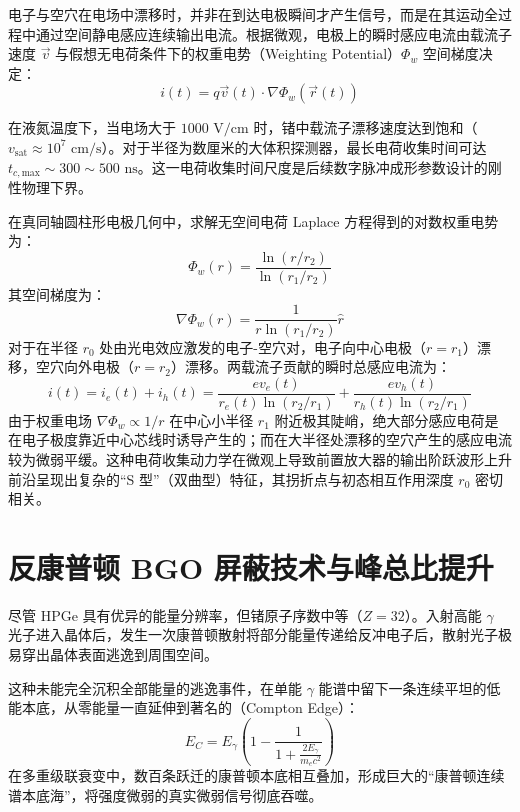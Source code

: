 电子与空穴在电场中漂移时，并非在到达电极瞬间才产生信号，而是在其运动全过程中通过空间静电感应连续输出电流。根据微观，电极上的瞬时感应电流由载流子速度 $\vec{v}$ 与假想无电荷条件下的权重电势（Weighting Potential）$\Phi_w$ 空间梯度决定：
\begin{equation}
    i(t) = q \vec{v}(t) \cdot \nabla \Phi_w(\vec{r}(t))
    \label{eq:shockley_ramo}
\end{equation}

在液氮温度下，当电场大于 $1000\text{ V/cm}$ 时，锗中载流子漂移速度达到饱和（$v_{\text{sat}} \approx 10^7\text{ cm/s}$）。对于半径为数厘米的大体积探测器，最长电荷收集时间可达 $t_{c,\text{max}} \sim 300 \sim 500\text{ ns}$。这一电荷收集时间尺度是后续数字脉冲成形参数设计的刚性物理下界。

在真同轴圆柱形电极几何中，求解无空间电荷 Laplace 方程得到的对数权重电势为：
\begin{equation}
    \Phi_w(r) = \frac{\ln(r/r_2)}{\ln(r_1/r_2)}
    \label{eq:coaxial_weighting_pot}
\end{equation}
其空间梯度为：
\begin{equation}
    \nabla \Phi_w(r) = \frac{1}{r \ln(r_1/r_2)} \hat{r}
    \label{eq:coaxial_weighting_field}
\end{equation}
对于在半径 $r_0$ 处由光电效应激发的电子-空穴对，电子向中心电极（$r=r_1$）漂移，空穴向外电极（$r=r_2$）漂移。两载流子贡献的瞬时总感应电流为：
\begin{equation}
    i(t) = i_e(t) + i_h(t) = \frac{e v_e(t)}{r_e(t) \ln(r_2/r_1)} + \frac{e v_h(t)}{r_h(t) \ln(r_2/r_1)}
    \label{eq:coaxial_total_current}
\end{equation}
由于权重电场 $\nabla \Phi_w \propto 1/r$ 在中心小半径 $r_1$ 附近极其陡峭，绝大部分感应电荷是在电子极度靠近中心芯线时诱导产生的；而在大半径处漂移的空穴产生的感应电流较为微弱平缓。这种电荷收集动力学在微观上导致前置放大器的输出阶跃波形上升前沿呈现出复杂的“S 型”（双曲型）特征，其拐折点与初态相互作用深度 $r_0$ 密切相关。

\section{反康普顿 BGO 屏蔽技术与峰总比提升}
\label{sec:bgo_compton_suppression}

尽管 HPGe 具有优异的能量分辨率，但锗原子序数中等（$Z = 32$）。入射高能 $\gamma$ 光子进入晶体后，发生一次康普顿散射将部分能量传递给反冲电子后，散射光子极易穿出晶体表面逃逸到周围空间。

这种未能完全沉积全部能量的逃逸事件，在单能 $\gamma$ 能谱中留下一条连续平坦的低能本底，从零能量一直延伸到著名的（Compton Edge）：
\begin{equation}
    E_C = E_\gamma \left( 1 - \frac{1}{1 + \frac{2 E_\gamma}{m_e c^2}} \right)
\end{equation}
在多重级联衰变中，数百条跃迁的康普顿本底相互叠加，形成巨大的“康普顿连续谱本底海”，将强度微弱的真实微弱信号彻底吞噬。

